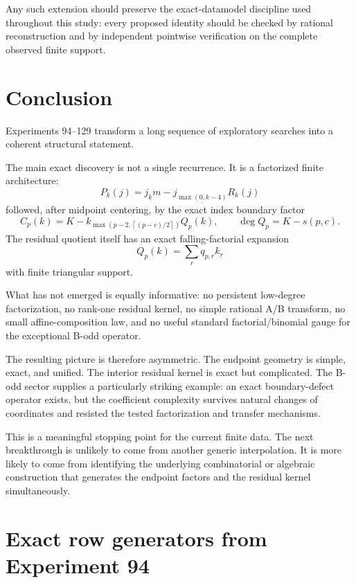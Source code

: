 \documentclass[11pt,a4paper]{article}
\newcommand{\fall}[2]{#1_{\underline{#2}}}
\newcommand{\ceil}[1]{\left\lceil #1 \right\rceil}
\begin{document}
Any such extension should preserve the exact-datamodel discipline used throughout this study: every proposed identity should be checked by rational reconstruction and by independent pointwise verification on the complete observed finite support.

\section{Conclusion}

Experiments 94--129 transform a long sequence of exploratory searches into a coherent structural statement.

The main exact discovery is not a single recurrence.  It is a factorized finite architecture:
\[
\boxed{
P_k(j)=\fall{j}{k}\fall{m-j}{\max(0,k-4)}R_k(j)
}
\]
followed, after midpoint centering, by the exact index boundary factor
\[
\boxed{
C_p(k)=\fall{K-k}{\max\left(p-2,\ceil{(p-c)/2}\right)}Q_p(k),
\qquad
\deg Q_p=K-s(p,c).
}
\]
The residual quotient itself has an exact falling-factorial expansion
\[
\boxed{
Q_p(k)=\sum_rq_{p,r}\fall{k}{r}
}
\]
with finite triangular support.

What has not emerged is equally informative: no persistent low-degree factorization, no rank-one residual kernel, no simple rational A/B transform, no small affine-composition law, and no useful standard factorial/binomial gauge for the exceptional B-odd operator.

The resulting picture is therefore asymmetric.  The endpoint geometry is simple, exact, and unified.  The interior residual kernel is exact but complicated.  The B-odd sector supplies a particularly striking example: an exact boundary-defect operator exists, but the coefficient complexity survives natural changes of coordinates and resisted the tested factorization and transfer mechanisms.

This is a meaningful stopping point for the current finite data.  The next breakthrough is unlikely to come from another generic interpolation.  It is more likely to come from identifying the underlying combinatorial or algebraic construction that generates the endpoint factors and the residual kernel simultaneously.

\appendix
\section{Exact row generators from Experiment 94}
\end{document}
